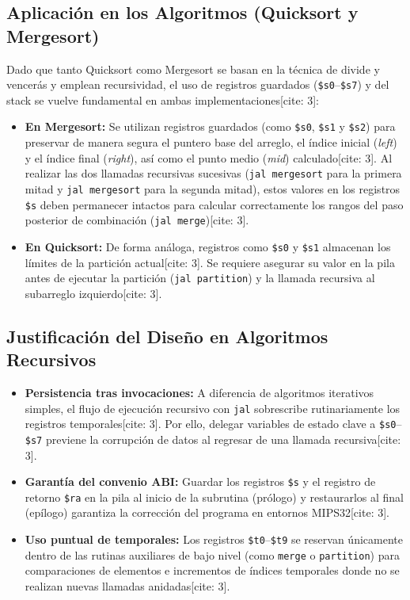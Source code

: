 \documentclass[12pt,a4paper]{article}
\begin{document}
\subsection{Aplicación en los Algoritmos (Quicksort y Mergesort)}
Dado que tanto Quicksort como Mergesort se basan en la técnica de divide y vencerás y emplean recursividad, el uso de registros guardados (\texttt{\$s0}--\texttt{\$s7}) y del stack se vuelve fundamental en ambas implementaciones[cite: 3]:
\begin{itemize}
    \item \textbf{En Mergesort:} Se utilizan registros guardados (como \texttt{\$s0}, \texttt{\$s1} y \texttt{\$s2}) para preservar de manera segura el puntero base del arreglo, el índice inicial (\textit{left}) y el índice final (\textit{right}), así como el punto medio (\textit{mid}) calculado[cite: 3]. Al realizar las dos llamadas recursivas sucesivas (\texttt{jal mergesort} para la primera mitad y \texttt{jal mergesort} para la segunda mitad), estos valores en los registros \texttt{\$s} deben permanecer intactos para calcular correctamente los rangos del paso posterior de combinación (\texttt{jal merge})[cite: 3].
    \item \textbf{En Quicksort:} De forma análoga, registros como \texttt{\$s0} y \texttt{\$s1} almacenan los límites de la partición actual[cite: 3]. Se requiere asegurar su valor en la pila antes de ejecutar la partición (\texttt{jal partition}) y la llamada recursiva al subarreglo izquierdo[cite: 3].
\end{itemize}

\subsection{Justificación del Diseño en Algoritmos Recursivos}
\begin{itemize}
    \item \textbf{Persistencia tras invocaciones:} A diferencia de algoritmos iterativos simples, el flujo de ejecución recursivo con \texttt{jal} sobrescribe rutinariamente los registros temporales[cite: 3]. Por ello, delegar variables de estado clave a \texttt{\$s0}--\texttt{\$s7} previene la corrupción de datos al regresar de una llamada recursiva[cite: 3].
    \item \textbf{Garantía del convenio ABI:} Guardar los registros \texttt{\$s} y el registro de retorno \texttt{\$ra} en la pila al inicio de la subrutina (prólogo) y restaurarlos al final (epílogo) garantiza la corrección del programa en entornos MIPS32[cite: 3].
    \item \textbf{Uso puntual de temporales:} Los registros \texttt{\$t0}--\texttt{\$t9} se reservan únicamente dentro de las rutinas auxiliares de bajo nivel (como \texttt{merge} o \texttt{partition}) para comparaciones de elementos e incrementos de índices temporales donde no se realizan nuevas llamadas anidadas[cite: 3].
\end{itemize}
\end{document}
